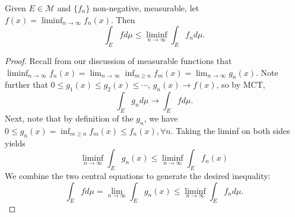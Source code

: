 \documentclass[11pt]{scrartcl}
\begin{document}
\begin{lemma}
Given $E\in \mathcal{M}$ and $\{f_n\}$ non-negative, measurable, let $f(x) = \liminf_{n \rightarrow \infty} f_n(x)$. Then $$ \int_E f d\mu \leq \liminf_{n \rightarrow \infty} \int_E f_n d\mu.$$
\end{lemma}
\begin{proof}
Recall from our discussion of measurable functions that $\liminf_{n\rightarrow\infty} f_n(x) =\lim_{n\rightarrow\infty} \inf_{m\geq n} f_m(x) = \lim_{n\rightarrow\infty} g_n(x)$. Note further that $0 \leq g_1(x) \leq g_2(x) \leq \cdots$, $g_n(x) \rightarrow f(x)$, so by MCT, $$\int_E g_n d\mu \rightarrow \int_E f d\mu.$$ Next, note that by definition of the $g_n$, we have $0\le g_n(x) = \inf_{m\geq n} f_m(x) \leq f_n(x), \forall n$. Taking the liminf on both sides yields 
$$\liminf_{n\rightarrow\infty} \int_E g_n(x) \leq \liminf_{n\rightarrow\infty} \int_E f_n(x) $$
We combine the two central equations to generate the desired inequality: 
$$ \int_E f d\mu = \lim_{n\rightarrow\infty}\int_E g_n(x)  \leq \liminf_{n \rightarrow \infty} \int_E f_n d\mu.$$
\end{proof}
\end{document}
